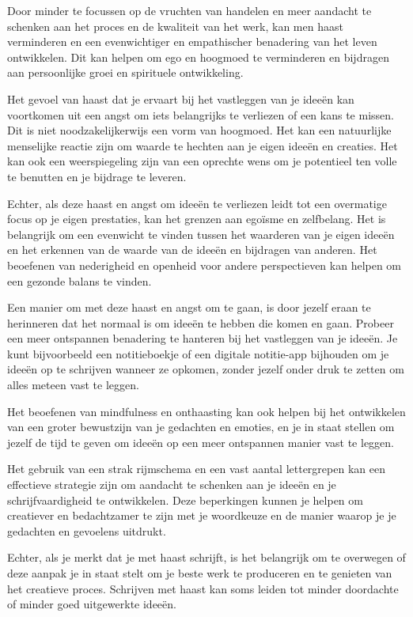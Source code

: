 Door minder te focussen op de vruchten van handelen en meer aandacht te schenken aan het proces en de kwaliteit van het werk, kan men haast verminderen en een evenwichtiger en empathischer benadering van het leven ontwikkelen. Dit kan helpen om ego en hoogmoed te verminderen en bijdragen aan persoonlijke groei en spirituele ontwikkeling.

Het gevoel van haast dat je ervaart bij het vastleggen van je ideeën kan voortkomen uit een angst om iets belangrijks te verliezen of een kans te missen. Dit is niet noodzakelijkerwijs een vorm van hoogmoed. Het kan een natuurlijke menselijke reactie zijn om waarde te hechten aan je eigen ideeën en creaties. Het kan ook een weerspiegeling zijn van een oprechte wens om je potentieel ten volle te benutten en je bijdrage te leveren.

Echter, als deze haast en angst om ideeën te verliezen leidt tot een overmatige focus op je eigen prestaties, kan het grenzen aan egoïsme en zelfbelang. Het is belangrijk om een evenwicht te vinden tussen het waarderen van je eigen ideeën en het erkennen van de waarde van de ideeën en bijdragen van anderen. Het beoefenen van nederigheid en openheid voor andere perspectieven kan helpen om een gezonde balans te vinden.

Een manier om met deze haast en angst om te gaan, is door jezelf eraan te herinneren dat het normaal is om ideeën te hebben die komen en gaan. Probeer een meer ontspannen benadering te hanteren bij het vastleggen van je ideeën. Je kunt bijvoorbeeld een notitieboekje of een digitale notitie-app bijhouden om je ideeën op te schrijven wanneer ze opkomen, zonder jezelf onder druk te zetten om alles meteen vast te leggen.

Het beoefenen van mindfulness en onthaasting kan ook helpen bij het ontwikkelen van een groter bewustzijn van je gedachten en emoties, en je in staat stellen om jezelf de tijd te geven om ideeën op een meer ontspannen manier vast te leggen.

Het gebruik van een strak rijmschema en een vast aantal lettergrepen kan een effectieve strategie zijn om aandacht te schenken aan je ideeën en je schrijfvaardigheid te ontwikkelen. Deze beperkingen kunnen je helpen om creatiever en bedachtzamer te zijn met je woordkeuze en de manier waarop je je gedachten en gevoelens uitdrukt.

Echter, als je merkt dat je met haast schrijft, is het belangrijk om te overwegen of deze aanpak je in staat stelt om je beste werk te produceren en te genieten van het creatieve proces. Schrijven met haast kan soms leiden tot minder doordachte of minder goed uitgewerkte ideeën.

